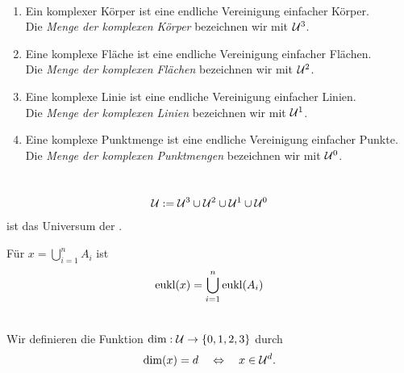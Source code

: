 \begin{dfn}\
    \begin{enumerate}
        \item Ein komplexer Körper ist eine endliche Vereinigung einfacher Körper.\\
            Die \emph{Menge der komplexen Körper} bezeichnen wir mit $\mathcal{U}^3$.
        \item Eine komplexe Fläche ist eine endliche Vereinigung einfacher Flächen.\\
            Die \emph{Menge der komplexen Flächen} bezeichnen wir mit $\mathcal{U}^2$.
        \item Eine komplexe Linie ist eine endliche Vereinigung einfacher Linien.\\
            Die \emph{Menge der komplexen Linien} bezeichnen wir mit $\mathcal{U}^1$.
        \item Eine komplexe Punktmenge ist eine endliche Vereinigung einfacher Punkte.\\
            Die \emph{Menge der komplexen Punktmengen} bezeichnen wir mit $\mathcal{U}^0$.
    \end{enumerate}
\end{dfn}


\begin{dfn}[Universum]\ 
    \begin{align*}
        \mathcal{U} := \mathcal{U}^3 \cup \mathcal{U}^2 \cup \mathcal{U}^1 \cup \mathcal{U}^0
    \end{align*}
    ist das Universum der \strukt.
\end{dfn}


\begin{dfn}
    Für $x = \bigcup_{i=1}^n A_i$ ist
    \begin{align*}
        \text{eukl}(x) = \bigcup_{i=1}^n \text{eukl}(A_i)
    \end{align*}
\end{dfn}


\begin{dfn}\ \\
    Wir definieren die Funktion $\text{dim} : \mathcal{U} \to \{0,1,2,3\}$ durch
    $$\text{dim}(x) = d \quad \Leftrightarrow \quad x \in \mathcal{U}^d.$$
\end{dfn}



